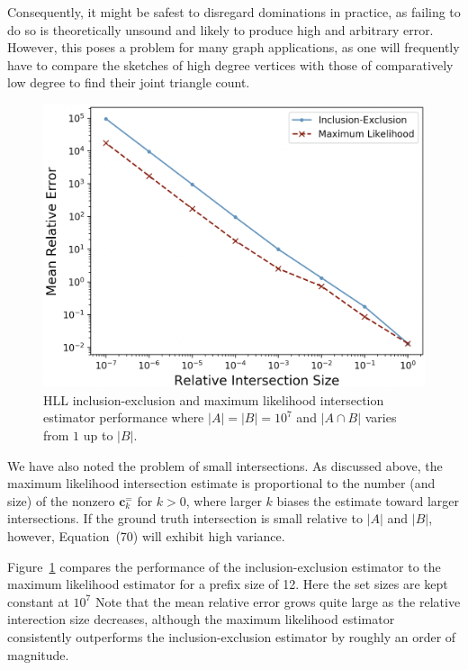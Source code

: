 \documentclass{vldb}
\newcommand{\algoname}[1]{\textnormal{\textsc{#1}}}
\begin{document}
\begin{appendix}
Consequently, it might be safest to disregard dominations in practice, as failing to do so is theoretically unsound and likely to produce high and arbitrary error.
However, this poses a problem for many graph applications, as one will frequently have to compare the sketches of high degree vertices with those of comparatively low degree to find their joint triangle count.

\begin{figure}
\centering
\includegraphics[width=0.8\columnwidth]{relative_intersection_size_vs_relative_error_equal}
\caption{\algoname{HLL} inclusion-exclusion and maximum likelihood intersection estimator performance where $|A| = |B| = 10^7$ and $|A \cap B|$ varies from $1$ up to $|B|$.
}
\label{fig:mle}
\end{figure}



We have also noted the problem of small intersections. 
As discussed above, the maximum likelihood intersection estimate is proportional to the number (and size) of the nonzero $\mathbf{c}^{=}_k$ for $k>0$, where larger $k$ biases the estimate toward larger intersections. 
If the ground truth intersection is small relative to $|A|$ and $|B|$, however, Equation~(70) will exhibit high variance.

Figure~\ref{fig:mle} compares the performance of the inclusion-exclusion estimator to the maximum likelihood estimator for a prefix size of 12.
Here the set sizes are kept constant at $10^7$
Note that the mean relative error grows quite large as the relative interection size decreases, although the maximum likelihood estimator consistently outperforms the inclusion-exclusion estimator by roughly an order of magnitude.




\end{appendix}
\end{document}
